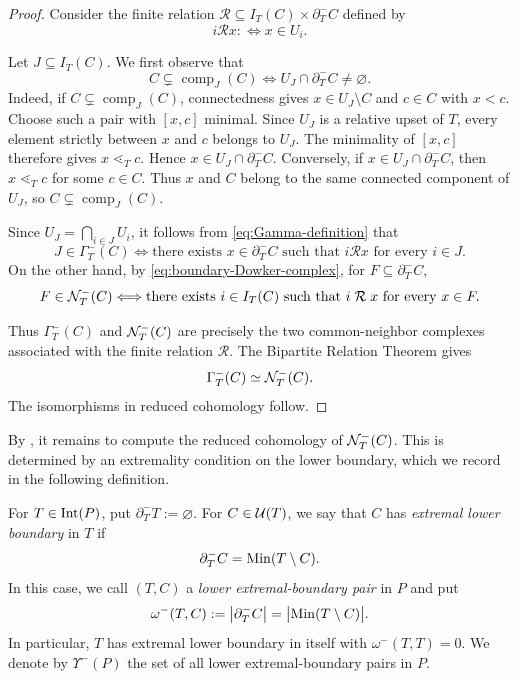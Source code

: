 \begin{proof}
Consider the finite relation
$\mathcal R\subseteq I_T(C)\times\partial_T^-C$ defined by
\[
i\mathrel{\mathcal R}x
:\Longleftrightarrow
x\in U_i.
\]

Let $J\subseteq I_T(C)$. We first observe that
\[
C\subsetneq\operatorname{comp}_J(C)
\Longleftrightarrow
U_J\cap\partial_T^-C\neq\varnothing.
\]
Indeed, if
$C\subsetneq\operatorname{comp}_J(C)$, connectedness gives
$x\in U_J\setminus C$ and $c\in C$ with $x<c$.
Choose such a pair with $[x,c]$ minimal.  Since $U_J$ is a relative
upset of $T$, every element strictly between $x$ and $c$ belongs to
$U_J$.  The minimality of $[x,c]$ therefore gives
$x\lessdot_T c$.  Hence
$x\in U_J\cap\partial_T^-C$.
Conversely, if $x\in U_J\cap\partial_T^-C$, then
$x\lessdot_T c$ for some $c\in C$.  Thus $x$ and $C$ belong to the same connected component of $U_J$, so
$C\subsetneq\operatorname{comp}_J(C)$.

Since $U_J=\bigcap_{i\in J}U_i$, it follows from
\eqref{eq:Gamma-definition} that
\[
J\in\Gamma_T^-(C)
\Longleftrightarrow
\text{there exists }x\in\partial_T^-C
\text{ such that }
i\mathrel{\mathcal R}x
\text{ for every }i\in J.
\]
On the other hand, by
\eqref{eq:boundary-Dowker-complex}, for
$F\subseteq\partial_T^-C$,
\[
F\in\mathcal N_T^-(C)
\Longleftrightarrow
\text{there exists }i\in I_T(C)
\text{ such that }
i\mathrel{\mathcal R}x
\text{ for every }x\in F.
\]

Thus $\Gamma_T^-(C)$ and $\mathcal N_T^-(C)$ are precisely the two
common-neighbor complexes associated with the finite relation
$\mathcal R$. The Bipartite Relation Theorem
\cite[Theorem~10.9]{Bjorner95} gives
\[
\Gamma_T^-(C)\simeq\mathcal N_T^-(C).
\]
The isomorphisms in reduced cohomology follow.
\end{proof}


By , it remains to compute the reduced
cohomology of $\mathcal N_T^-(C)$. This is determined by an extremality
condition on the lower boundary, which we record in the following
definition.


\begin{definition}
\label{def:lower-extremal-boundary-pairs}
For $T\in\operatorname{Int}(P)$, put $\partial_T^-T:=\varnothing$. 
For $C\in \mathcal U(T)$, we say that
$C$ has \emph{extremal lower boundary} in $T$ if
\[
\partial_T^-C=\operatorname{Min}(T\setminus C).
\]
In this case, we call $(T,C)$ a \emph{lower extremal-boundary pair}
in $P$ and put
\[
\omega^-(T,C)
:=
\bigl|\partial_T^-C\bigr|
=
\bigl|\operatorname{Min}(T\setminus C)\bigr|.
\]
In particular, $T$ has extremal lower boundary in itself with $\omega^-(T,T)=0$.
We denote by $\Upsilon^-(P)$ the set of all lower extremal-boundary
pairs in $P$.
\end{definition}




